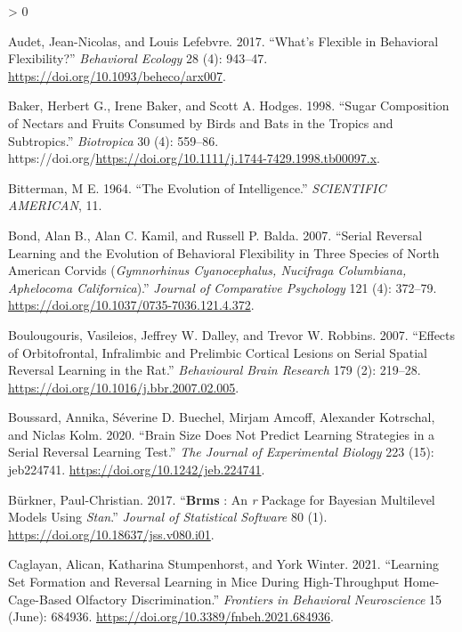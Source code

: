\documentclass[
]{article}
\newlength{\cslhangindent}
\newenvironment{CSLReferences}[2] %
 {%
  \setlength{\parindent}{0pt}
  \ifodd #1 \everypar{\setlength{\hangindent}{\cslhangindent}}\ignorespaces\fi
  \ifnum #2 > 0
  \setlength{\parskip}{#2\baselineskip}
  \fi
 }%
 {}
\begin{document}
\hypertarget{refs}{}
\begin{CSLReferences}{1}{0}
\leavevmode\hypertarget{ref-audet_whats_2017}{}%
Audet, Jean-Nicolas, and Louis Lefebvre. 2017. {``What's Flexible in Behavioral Flexibility?''} \emph{Behavioral Ecology} 28 (4): 943--47. \url{https://doi.org/10.1093/beheco/arx007}.

\leavevmode\hypertarget{ref-baker_sugar_1998}{}%
Baker, Herbert G., Irene Baker, and Scott A. Hodges. 1998. {``Sugar {Composition} of {Nectars} and {Fruits} {Consumed} by {Birds} and {Bats} in the {Tropics} and {Subtropics}.''} \emph{Biotropica} 30 (4): 559--86. https://doi.org/\url{https://doi.org/10.1111/j.1744-7429.1998.tb00097.x}.

\leavevmode\hypertarget{ref-bitterman_evolution_1964}{}%
Bitterman, M E. 1964. {``The {Evolution} of {Intelligence}.''} \emph{SCIENTIFIC AMERICAN}, 11.

\leavevmode\hypertarget{ref-bond_serial_2007-1}{}%
Bond, Alan B., Alan C. Kamil, and Russell P. Balda. 2007. {``Serial Reversal Learning and the Evolution of Behavioral Flexibility in Three Species of {North} {American} Corvids (\emph{{Gymnorhinus} Cyanocephalus, {Nucifraga} Columbiana, {Aphelocoma} Californica}).''} \emph{Journal of Comparative Psychology} 121 (4): 372--79. \url{https://doi.org/10.1037/0735-7036.121.4.372}.

\leavevmode\hypertarget{ref-boulougouris_effects_2007}{}%
Boulougouris, Vasileios, Jeffrey W. Dalley, and Trevor W. Robbins. 2007. {``Effects of Orbitofrontal, Infralimbic and Prelimbic Cortical Lesions on Serial Spatial Reversal Learning in the Rat.''} \emph{Behavioural Brain Research} 179 (2): 219--28. \url{https://doi.org/10.1016/j.bbr.2007.02.005}.

\leavevmode\hypertarget{ref-boussard_brain_2020}{}%
Boussard, Annika, Séverine D. Buechel, Mirjam Amcoff, Alexander Kotrschal, and Niclas Kolm. 2020. {``Brain Size Does Not Predict Learning Strategies in a Serial Reversal Learning Test.''} \emph{The Journal of Experimental Biology} 223 (15): jeb224741. \url{https://doi.org/10.1242/jeb.224741}.

\leavevmode\hypertarget{ref-burkner_brms_2017}{}%
Bürkner, Paul-Christian. 2017. {``\textbf{Brms} : {An} \emph{r} {Package} for {Bayesian} {Multilevel} {Models} {Using} \emph{Stan}.''} \emph{Journal of Statistical Software} 80 (1). \url{https://doi.org/10.18637/jss.v080.i01}.

\leavevmode\hypertarget{ref-caglayan_learning_2021}{}%
Caglayan, Alican, Katharina Stumpenhorst, and York Winter. 2021. {``Learning {Set} {Formation} and {Reversal} {Learning} in {Mice} {During} {High}-{Throughput} {Home}-{Cage}-{Based} {Olfactory} {Discrimination}.''} \emph{Frontiers in Behavioral Neuroscience} 15 (June): 684936. \url{https://doi.org/10.3389/fnbeh.2021.684936}.


\end{CSLReferences}
\end{document}

